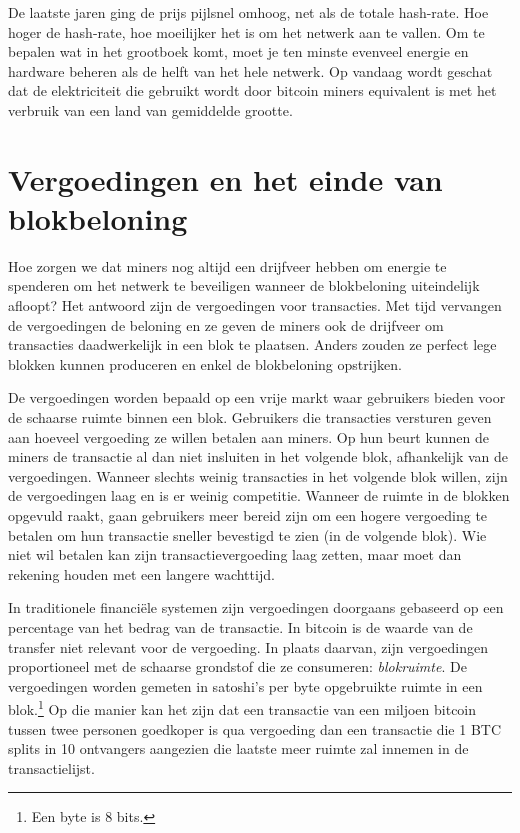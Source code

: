 \documentclass[smalldemyvopaper,11pt,twoside,onecolumn,openright,extrafontsizes]{memoir}
\begin{document}
De laatste jaren ging de prijs pijlsnel omhoog, net als de totale hash-rate. Hoe hoger de hash-rate, hoe moeilijker het is om het netwerk aan te vallen. Om te bepalen wat in het grootboek komt, moet je ten minste evenveel energie en hardware beheren als de helft van het hele netwerk. Op vandaag wordt geschat dat de elektriciteit die gebruikt wordt door bitcoin miners equivalent is met het verbruik van een land van gemiddelde grootte.

\section{Vergoedingen en het einde van blokbeloning}

Hoe zorgen we dat miners nog altijd een drijfveer hebben om energie te spenderen om het netwerk te beveiligen wanneer de blokbeloning uiteindelijk afloopt? Het antwoord zijn de vergoedingen voor transacties. Met tijd vervangen de vergoedingen de beloning en ze geven de miners ook de drijfveer om transacties daadwerkelijk in een blok te plaatsen. Anders zouden ze perfect lege blokken kunnen produceren en enkel de blokbeloning opstrijken.

De vergoedingen worden bepaald op een vrije markt waar gebruikers bieden voor de schaarse ruimte binnen een blok. Gebruikers die transacties versturen geven aan hoeveel vergoeding ze willen betalen aan miners. Op hun beurt kunnen de miners de transactie al dan niet insluiten in het volgende blok, afhankelijk van de vergoedingen. Wanneer slechts weinig transacties in het volgende blok willen, zijn de vergoedingen laag en is er weinig competitie. Wanneer de ruimte in de blokken opgevuld raakt, gaan gebruikers meer bereid zijn om een hogere vergoeding te betalen om hun transactie sneller bevestigd te zien (in de volgende blok). Wie niet wil betalen kan zijn transactievergoeding laag zetten, maar moet dan rekening houden met een langere wachttijd.

In traditionele financiële systemen zijn vergoedingen doorgaans gebaseerd op een percentage van het bedrag van de transactie. In bitcoin is de waarde van de transfer niet relevant voor de vergoeding. In plaats daarvan, zijn vergoedingen proportioneel met de schaarse grondstof die ze consumeren: \textit{blokruimte}. De vergoedingen worden gemeten in satoshi’s per byte opgebruikte ruimte in een blok.\footnote{Een byte is 8 bits.} Op die manier kan het zijn dat een transactie van een miljoen bitcoin tussen twee personen goedkoper is qua vergoeding dan een transactie die 1 BTC splits in 10 ontvangers aangezien die laatste meer ruimte zal innemen in de transactielijst.
\end{document}
